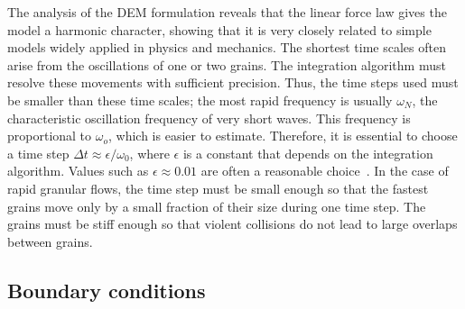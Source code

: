 The analysis of the DEM formulation reveals that the linear 
force law gives the model a harmonic character, showing that it is very closely 
related to simple models widely applied in physics and mechanics. The shortest 
time scales often arise from the oscillations of one or two grains. The 
integration algorithm must resolve these movements with sufficient precision. 
Thus, the time steps used must be smaller than these time scales; the most 
rapid frequency is usually ${\omega}_{\mathit{N}}$, the characteristic 
oscillation frequency of very short waves. This frequency is proportional to 
$\omega _{o}$, which is easier to estimate. Therefore, it is essential 
to choose a time step $\Delta t \approx \epsilon / \omega_{0}$, where 
$\epsilon$ is a constant that depends on the integration algorithm. Values such 
as $\epsilon \approx 0.01$ are often a reasonable choice~\citep{Radjai2011}. In 
the case of rapid granular flows, the time step must be small enough so that 
the fastest grains move only by a small fraction of their size during one 
time step. The grains must be stiff enough so that violent collisions do not 
lead to large overlaps between grains. 



\subsection{Boundary conditions}

